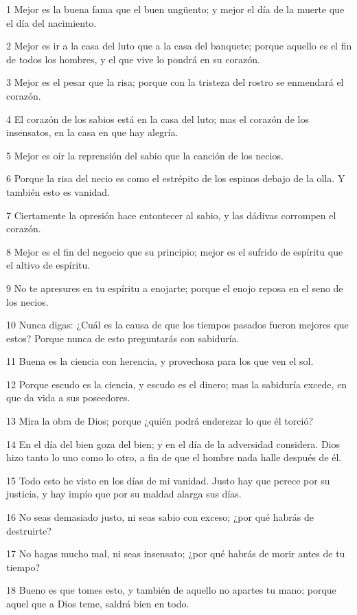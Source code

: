 \par 1 Mejor es la buena fama que el buen ungüento; y mejor el día de la muerte que el día del nacimiento.
\par 2 Mejor es ir a la casa del luto que a la casa del banquete; porque aquello es el fin de todos los hombres, y el que vive lo pondrá en su corazón.
\par 3 Mejor es el pesar que la risa; porque con la tristeza del rostro se enmendará el corazón.
\par 4 El corazón de los sabios está en la casa del luto; mas el corazón de los insensatos, en la casa en que hay alegría.
\par 5 Mejor es oír la reprensión del sabio que la canción de los necios.
\par 6 Porque la risa del necio es como el estrépito de los espinos debajo de la olla. Y también esto es vanidad.
\par 7 Ciertamente la opresión hace entontecer al sabio, y las dádivas corrompen el corazón.
\par 8 Mejor es el fin del negocio que su principio; mejor es el sufrido de espíritu que el altivo de espíritu.
\par 9 No te apresures en tu espíritu a enojarte; porque el enojo reposa en el seno de los necios.
\par 10 Nunca digas: ¿Cuál es la causa de que los tiempos pasados fueron mejores que estos? Porque nunca de esto preguntarás con sabiduría.
\par 11 Buena es la ciencia con herencia, y provechosa para los que ven el sol.
\par 12 Porque escudo es la ciencia, y escudo es el dinero; mas la sabiduría excede, en que da vida a sus poseedores.
\par 13 Mira la obra de Dios; porque ¿quién podrá enderezar lo que él torció?
\par 14 En el día del bien goza del bien; y en el día de la adversidad considera. Dios hizo tanto lo uno como lo otro, a fin de que el hombre nada halle después de él.
\par 15 Todo esto he visto en los días de mi vanidad. Justo hay que perece por su justicia, y hay impío que por su maldad alarga sus días.
\par 16 No seas demasiado justo, ni seas sabio con exceso; ¿por qué habrás de destruirte?
\par 17 No hagas mucho mal, ni seas insensato; ¿por qué habrás de morir antes de tu tiempo?
\par 18 Bueno es que tomes esto, y también de aquello no apartes tu mano; porque aquel que a Dios teme, saldrá bien en todo.
